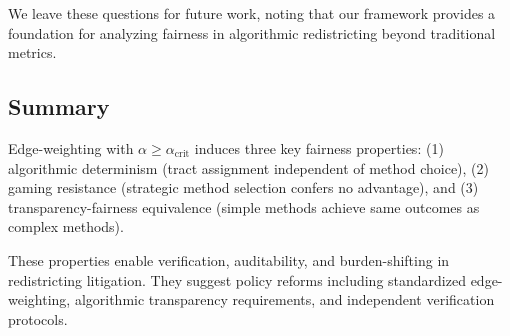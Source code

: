 We leave these questions for future work, noting that our framework provides a foundation for analyzing fairness in algorithmic redistricting beyond traditional metrics.

\subsection{Summary}

Edge-weighting with $\alpha \geq \alpha_{\text{crit}}$ induces three key fairness properties: (1) algorithmic determinism (tract assignment independent of method choice), (2) gaming resistance (strategic method selection confers no advantage), and (3) transparency-fairness equivalence (simple methods achieve same outcomes as complex methods).

These properties enable verification, auditability, and burden-shifting in redistricting litigation. They suggest policy reforms including standardized edge-weighting, algorithmic transparency requirements, and independent verification protocols.
